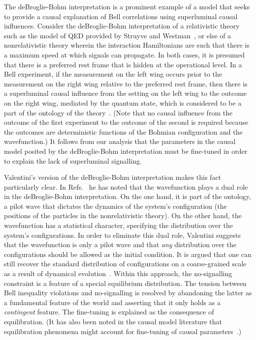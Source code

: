 \documentclass[12pt,onecolumn,nofootinbib]{revtex4-2}
\begin{document}
The deBroglie-Bohm interpretation is a prominent example of a model that seeks to provide a causal explanation of Bell correlations using superluminal causal influences. Consider the
deBroglie-Bohm interpretation of a relativistic theory such as the model of QED provided by Struyve
and Westman~\cite{Struyve2007}, or else of a nonrelativistic theory wherein the interaction
Hamiltonians are such that there is a maximum speed at which signals can
propagate.  In both cases, it is presumed that there is a preferred rest frame that is hidden at the operational level.
In a Bell experiment, if the measurement on the left wing occurs prior to the measurement on the right wing relative to the preferred rest frame, then there is a superluminal causal influence from the setting on the left wing to the outcome on the right wing, mediated by the
quantum state, which is considered to be a part of the ontology of the
theory~\cite{Bohm1993}.  (Note that no causal influence from the outcome of the first experiment to the
outcome of the second is required because the outcomes are deterministic functions of the Bohmian configuration and the wavefunction.) It follows from our analysis that the parameters in the causal model posited by the deBroglie-Bohm interpretation must be fine-tuned in order to explain the lack of superluminal signalling.

Valentini's version of the deBroglie-Bohm interpretation makes this fact
particularly clear. In Refs.~\cite{Valentini1991a,Valentini1991b} he has noted that the
wavefunction plays a dual role in the deBroglie-Bohm interpretation. On the
one hand, it is part of the ontology, a pilot wave that dictates the
dynamics of the system's configuration (the positions of the particles in
the nonrelativistic theory). On the other hand, the wavefunction has a statistical character, specifying the  distribution over the system's configurations. In order to
eliminate this dual role, Valentini suggests that the wavefunction is
only a pilot wave and that \emph{any} distribution over the configurations
should be allowed as the initial condition. It is argued that one
can still recover the standard distribution of configurations on a coarse-grained scale
as a result of  dynamical evolution~\cite{Valentini2008}. Within this approach, the no-signalling
constraint is a feature of a special equilibrium distribution.
The tension between Bell inequality violations and no-signalling is resolved
by abandoning the latter as a fundamental feature of the world and asserting
that it only holds as a \emph{contingent} feature. The fine-tuning is
explained as the consequence of equilibration. (It has also been noted in the
causal model literature that equilibration phenomena might account for fine-tuning of causal parameters~\cite{dash2005}.) 
\end{document}
